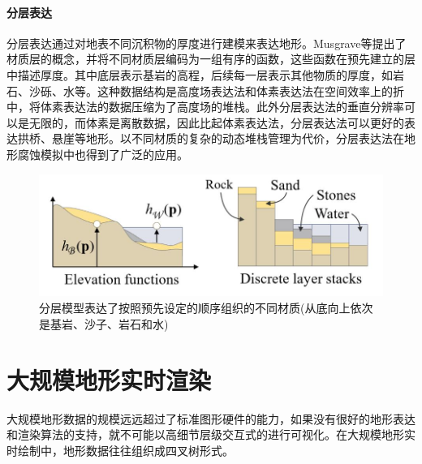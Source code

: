 \paragraph{分层表达}
分层表达通过对地表不同沉积物的厚度进行建模来表达地形。Musgrave等\supercite{Musgrave1998The}提出了材质层的概念，并将不同材质层编码为一组有序的函数，这些函数在预先建立的层中描述厚度。其中底层表示基岩的高程，后续每一层表示其他物质的厚度，如岩石、沙砾、水等。这种数据结构是高度场表达法和体素表达法在空间效率上的折中，将体素表达法的数据压缩为了高度场的堆栈。此外分层表达法的垂直分辨率可以是无限的，而体素是离散数据，因此比起体素表达法，分层表达法可以更好的表达拱桥、悬崖等地形。以不同材质的复杂的动态堆栈管理为代价，分层表达法在地形腐蚀模拟中也得到了广泛的应用。
\begin{figure}[h]
\centering
\includegraphics[height=4cm,width=11.5cm]{figures/layer.JPG}
\caption{分层模型表达了按照预先设定的顺序组织的不同材质(从底向上依次是基岩、沙子、岩石和水)\supercite{eric-review}}
\end{figure}

\section{大规模地形实时渲染}
大规模地形数据的规模远远超过了标准图形硬件的能力，如果没有很好的地形表达和渲染算法的支持，就不可能以高细节层级交互式的进行可视化。在大规模地形实时绘制中，地形数据往往组织成四叉树形式。\supercite{Pajarola1998Large}
